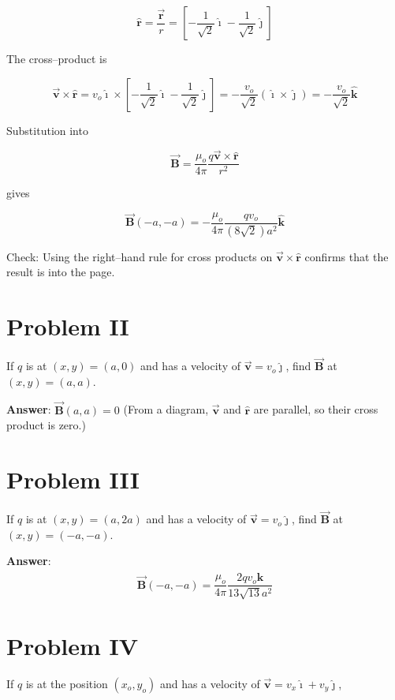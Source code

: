 \documentclass{article}
\newcommand{\ihat}[0]{\hat{\boldsymbol{\imath}}}
\newcommand{\jhat}[0]{\hat{\boldsymbol{\jmath}}}
\newcommand{\khat}[0]{\hat{\boldsymbol{k}}}
\newcommand{\bfvec}[1]{\vec{\mathbf{#1}}}
\begin{document}
$$\hat{\mathbf{r}}=\frac{\bfvec{r}}{r} = \left[-\frac{1}{\sqrt{2}}\ihat - \frac{1}{\sqrt{2}}\jhat\right]$$

The cross--product is

$$\bfvec{v}\times\hat{\mathbf{r}}=v_o\ihat\times\left[-\frac{1}{\sqrt{2}}\ihat - \frac{1}{\sqrt{2}}\jhat\right] = -\frac{v_o}{\sqrt{2}}(\ihat\times\jhat) = -\frac{v_o}{\sqrt{2}}\khat$$

Substitution into 

$$\bfvec{B} = \frac{\mu_o}{4\pi}\frac{q\bfvec{v}\times\hat{\mathbf{r}}}{r^2}$$

gives

$$\bfvec{B}(-a,-a) = -\frac{\mu_o}{4\pi} \frac{qv_o}{(8\sqrt{2})a^2}\khat$$

Check: Using the right--hand rule for cross products on $\bfvec{v}\times\hat{\mathbf{r}}$ confirms that the result is into the page.
\else
\vskip 288pt
\fi

\section{Problem II}

If $q$ is at $(x,y)=(a,0)$ and has a velocity of $\bfvec{v}=v_o\jhat$, find $\bfvec{B}$ at $(x,y)=(a,a)$.

\ifsolutions
\textbf{Answer}: $\bfvec{B}(a,a)=0$ (From a diagram, $\bfvec{v}$ and $\hat{\mathbf{r}}$ are parallel, so their cross product is zero.)
\else
\vskip 144pt
\fi

\ifsolutions

\else

\newpage
\fi

\section{Problem III}

If $q$ is at $(x,y)=(a,2a)$ and has a velocity of $\bfvec{v}=v_o\jhat$, find $\bfvec{B}$ at $(x,y)=(-a,-a)$.

\ifsolutions
\textbf{Answer}: 
$$\bfvec{B}(-a,-a)= \frac{\mu_o}{4\pi} \frac{2qv_o\khat}{13\sqrt{13}a^2}$$
\else
\vskip 216pt
\fi

\section{Problem IV}

If $q$ is at the position $(x_o,y_o)$ and has a velocity of $\bfvec{v}=v_x\ihat+v_y\jhat$, 
\end{document}
